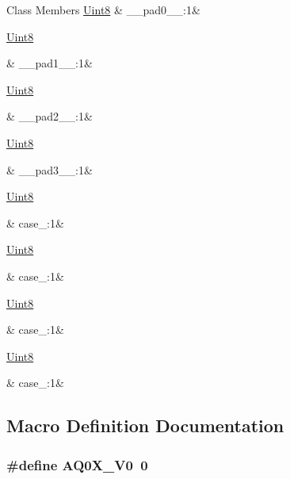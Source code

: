 \begin{DoxyFields}{Class Members}
\hypertarget{a00003_a74a47a7eac047138ff811ede153943e6}{\hyperlink{a00001_a979e3e23b9a449e69ab6a8a83b6042f8}{Uint8}}\label{a00003_a74a47a7eac047138ff811ede153943e6}
&
\+\_\+\+\_\+pad0\+\_\+\+\_\+\+:1&
\\
\hline

\hypertarget{a00003_abb67792e94e88254ca5afecf7c26c912}{\hyperlink{a00001_a979e3e23b9a449e69ab6a8a83b6042f8}{Uint8}}\label{a00003_abb67792e94e88254ca5afecf7c26c912}
&
\+\_\+\+\_\+pad1\+\_\+\+\_\+\+:1&
\\
\hline

\hypertarget{a00003_a2780c6c77e1f937563d98e2f517c2aeb}{\hyperlink{a00001_a979e3e23b9a449e69ab6a8a83b6042f8}{Uint8}}\label{a00003_a2780c6c77e1f937563d98e2f517c2aeb}
&
\+\_\+\+\_\+pad2\+\_\+\+\_\+\+:1&
\\
\hline

\hypertarget{a00003_ad30f3f7ff6b12f7b97db2c89403b4238}{\hyperlink{a00001_a979e3e23b9a449e69ab6a8a83b6042f8}{Uint8}}\label{a00003_ad30f3f7ff6b12f7b97db2c89403b4238}
&
\+\_\+\+\_\+pad3\+\_\+\+\_\+\+:1&
\\
\hline

\hypertarget{a00003_a2dc2090faca603cc8979802e609d6fbf}{\hyperlink{a00001_a979e3e23b9a449e69ab6a8a83b6042f8}{Uint8}}\label{a00003_a2dc2090faca603cc8979802e609d6fbf}
&
case\+\_\+:1&
\\
\hline

\hypertarget{a00003_ae3dbe89a1e307d834912181da872fffd}{\hyperlink{a00001_a979e3e23b9a449e69ab6a8a83b6042f8}{Uint8}}\label{a00003_ae3dbe89a1e307d834912181da872fffd}
&
case\+\_\+:1&
\\
\hline

\hypertarget{a00003_a4c5c54941d081abd8e54ac2086794458}{\hyperlink{a00001_a979e3e23b9a449e69ab6a8a83b6042f8}{Uint8}}\label{a00003_a4c5c54941d081abd8e54ac2086794458}
&
case\+\_\+:1&
\\
\hline

\hypertarget{a00003_ad8cf339eb2bcc62ab9c0ca2a295056e0}{\hyperlink{a00001_a979e3e23b9a449e69ab6a8a83b6042f8}{Uint8}}\label{a00003_ad8cf339eb2bcc62ab9c0ca2a295056e0}
&
case\+\_\+:1&
\\
\hline

\end{DoxyFields}


\subsection{Macro Definition Documentation}
\hypertarget{a00003_ad750d25410f340cb93a424349ccecdd3}{
\subsubsection[{A\+Q0\+X\+\_\+\+V0}]{\setlength{\rightskip}{0pt plus 5cm}\#define A\+Q0\+X\+\_\+\+V0~0}}\label{a00003_ad750d25410f340cb93a424349ccecdd3}


